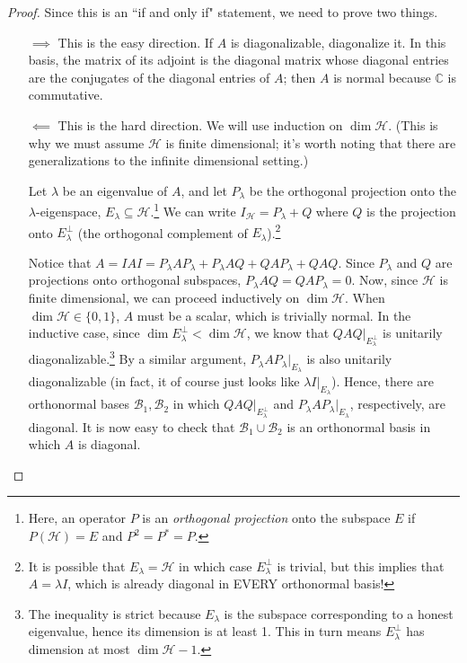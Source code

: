 \documentclass{article}
\newcommand{\calH}{\mathcal{H}}
\begin{document}
\begin{proof}
Since this is an ``if and only if" statement, we need to prove two things.

\begin{itemize}
    \item[$\implies$] This is the easy direction. If $A$ is diagonalizable, diagonalize it. In this basis, the matrix of its adjoint is the diagonal matrix whose diagonal entries are the conjugates of the diagonal entries of $A$; then $A$ is normal because $\mathbb{C}$ is commutative.
    \item[$\impliedby$] This is the hard direction.  We will use induction on $\dim\calH$.  (This is why we must assume $\calH$ is finite dimensional; it's worth noting that there are generalizations to the infinite dimensional setting.)

	Let $\lambda$ be an eigenvalue of $A$, and let $P_\lambda$ be the orthogonal projection onto the $\lambda$-eigenspace, $E_\lambda \subseteq \mathcal{H}$.\footnote{Here, an operator $P$ is an {\em orthogonal projection} onto the subspace $E$ if $P(\mathcal{H}) = E$ and $P^2 = P^* = P$.} We can write $I_\mathcal{H} = P_\lambda + Q$ where $Q$ is the projection onto $E_\lambda^\perp$ (the orthogonal complement of $E_\lambda$).\footnote{It is possible that $E_\lambda = \mathcal{H}$ in which case $E_\lambda^\perp$ is trivial, but this implies that $A = \lambda I$, which is already diagonal in EVERY orthonormal basis!}
    
    Notice that $A = IAI = P_\lambda A P_\lambda + P_\lambda A Q + Q A P_\lambda + QAQ$. Since $P_\lambda$ and $Q$ are projections onto orthogonal subspaces, $P_\lambda A Q = Q A P_\lambda = 0$.
    Now, since $\mathcal{H}$ is finite dimensional, we can proceed inductively on $\dim\mathcal{H}$.
    When $\dim\mathcal{H}\in\{0, 1\}$, $A$ must be a scalar, which is trivially normal.
    In the inductive case, since $\dim E_\lambda^\perp < \dim\mathcal{H}$, we know that $QAQ|_{E_\lambda^\perp}$ is unitarily diagonalizable.\footnote{The inequality is strict because $E_\lambda$ is the subspace corresponding to a honest eigenvalue, hence its dimension is at least 1.  This in turn means $E_\lambda^\perp$ has dimension at most $\dim\calH - 1$.} By a similar argument, $P_\lambda A P_\lambda |_{E_\lambda}$ is also unitarily diagonalizable (in fact, it of course just looks like $\lambda I|_{E_\lambda}$). Hence, there are orthonormal bases $\mathcal{B}_1, \mathcal{B}_2$ in which $QAQ|_{E_\lambda^\perp}$ and $P_\lambda AP_\lambda|_{E_\lambda}$, respectively, are diagonal. It is now easy to check that $\mathcal{B}_1\cup\mathcal{B}_2$ is an orthonormal basis in which $A$ is diagonal.

\end{itemize}

\end{proof}
\end{document}
